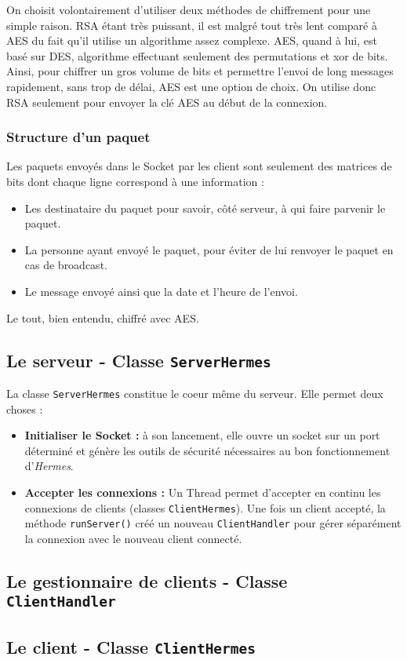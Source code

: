 \documentclass{article}
\begin{document}
On choisit volontairement d'utiliser deux méthodes de chiffrement pour une simple raison. 
RSA étant très puissant, il est malgré tout très lent comparé à AES du fait qu'il utilise un algorithme assez complexe. 
AES, quand à lui, est basé sur DES, algorithme effectuant seulement des permutations et xor de bits. 
Ainsi, pour chiffrer un gros volume de bits et permettre l'envoi de long messages rapidement, sans trop de délai, AES est une option de choix. 
On utilise donc RSA seulement pour envoyer la clé AES au début de la connexion. 

\subsubsection{Structure d'un paquet}

Les paquets envoyés dans le Socket par les client sont seulement des matrices de bits dont chaque ligne correspond à une information :
\begin{itemize}
    \item Les destinataire du paquet pour savoir, côté serveur, à qui faire parvenir le paquet. 
    \item La personne ayant envoyé le paquet, pour éviter de lui renvoyer le paquet en cas de broadcast. 
    \item Le message envoyé ainsi que la date et l'heure de l'envoi. 
\end{itemize}
Le tout, bien entendu, chiffré avec AES. 

\subsection{Le serveur - Classe \texttt{ServerHermes}}

La classe \texttt{ServerHermes} constitue le coeur même du serveur. 
Elle permet deux choses :
\begin{itemize}
    \item \textbf{Initialiser le Socket : } à son lancement, elle ouvre un socket sur un port déterminé et génère les outils 
    de sécurité nécessaires au bon fonctionnement d'\emph{Hermes}. 
    \item \textbf{Accepter les connexions : } Un Thread permet d'accepter en continu les connexions de clients (classes \texttt{ClientHermes}). 
    Une fois un client accepté, la méthode \texttt{runServer()} créé un nouveau \texttt{ClientHandler} pour gérer séparément 
    la connexion avec le nouveau client connecté. 
\end{itemize}

\subsection{Le gestionnaire de clients - Classe \texttt{ClientHandler}}

\subsection{Le client - Classe \texttt{ClientHermes}}
\end{document}
